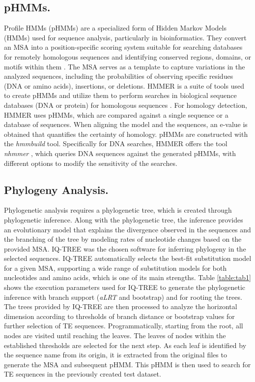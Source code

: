 \documentclass[unnumsec,webpdf,contemporary,large]{oup-authoring-template}%
\theoremstyle{thmstyleone}%
\theoremstyle{thmstyletwo}%
\theoremstyle{thmstylethree}%
\begin{document}
\subsection{pHMMs.}\label{subsec2_2}

Profile HMMs (pHMMs) are a specialized form of Hidden Markov Models (HMMs) used for sequence analysis, particularly in bioinformatics. They convert an MSA into a position-specific scoring system suitable for searching databases for remotely homologous sequences and identifying conserved regions, domains, or motifs within them \cite{eddy_profile_1998}. The MSA serves as a template to capture variations in the analyzed sequences, including the probabilities of observing specific residues (DNA or amino acids), insertions, or deletions.
HMMER is a suite of tools used to create pHMMs and utilize them to perform searches in biological sequence databases (DNA or protein) for homologous sequences \cite{eddy_profile_1998}. For homology detection, HMMER uses pHMMs, which are compared against a single sequence or a database of sequences. When aligning the model and the sequences, an e-value is obtained that quantifies the certainty of homology. pHMMs are constructed with the \textit{hmmbuild} tool. Specifically for DNA searches, HMMER offers the tool \textit{nhmmer} \cite{wheeler_nhmmer_2013}, which queries DNA sequences against the generated pHMMs, with different options to modify the sensitivity of the searches.

\subsection{Phylogeny Analysis.}\label{subsec2_3}

Phylogenetic analysis requires a phylogenetic tree, which is created through phylogenetic inference. Along with the phylogenetic tree, the inference provides an evolutionary model that explains the divergence observed in the sequences and the branching of the tree by modeling rates of nucleotide changes based on the provided MSA. IQ-TREE \cite{bui_quang_minh_iq-tree_2022} was the chosen software for inferring phylogeny in the selected sequences. IQ-TREE automatically selects the best-fit substitution model for a given MSA, supporting a wide range of substitution models for both nucleotides and amino acids, which is one of its main strengths. Table \ref{table:tab1} shows the execution parameters used for IQ-TREE to generate the phylogenetic inference with branch support (\textit{aLRT} and bootstrap) and for rooting the trees. The trees provided by IQ-TREE are then processed to analyze the horizontal dimension according to thresholds of branch distance or bootstrap values for further selection of TE sequences. Programmatically, starting from the root, all nodes are visited until reaching the leaves. The leaves of nodes within the established thresholds are selected for the next step. As each leaf is identified by the sequence name from its origin, it is extracted from the original files to generate the MSA and subsequent pHMM. This pHMM is then used to search for TE sequences in the previously created test dataset.
\end{document}

